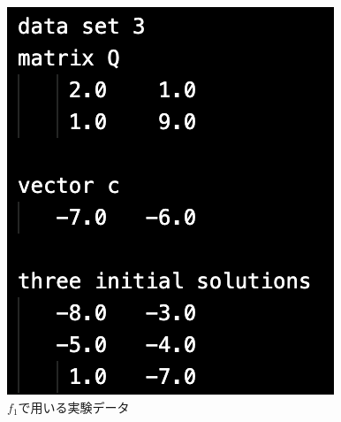 \documentclass[12pt]{jarticle}
\begin{document}
\begin{figure}[h]
\begin{minipage}{0.3\hsize}
\begin{center}
        \end{center}
    \end{minipage}
    \begin{minipage}{0.3\hsize}
        \begin{center}
            \includegraphics[scale=0.35]{kadai1_1data3.png}
        \end{center}
    \end{minipage}
    \caption{$f_1$で用いる実験データ}
\end{figure}
\end{document}
